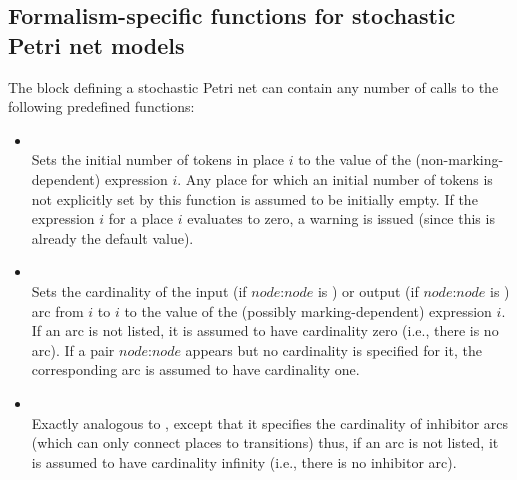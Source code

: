 \begin{private}

\section{Formalism-specific functions for stochastic Petri net models}
\label{SEC:spn-predefined-builder-functions}



The block defining a stochastic Petri net can contain any number
of calls to the following predefined functions:

\begin{itemize}

\item
{}\\
Sets the initial number of tokens in place $i$ to the value of the
(non-marking-dependent)  expression $i$.
Any place for which an initial number of tokens is not explicitly set
by this function is assumed to be initially empty.
If the expression $i$ for a place $i$ evaluates to zero,
a warning is issued (since this is already the default value).

\item
{}\\
Sets the cardinality of the input (if $node$:$node$ is )
or output (if  $node$:$node$ is ) arc
from $i$ to $i$ to the value of the
(possibly marking-dependent)  expression $i$.
If an arc is not listed, it is assumed to have cardinality zero
(i.e., there is no arc).
If a pair $node$:$node$ appears but no cardinality is specified for it, the
corresponding arc is assumed to have cardinality one.

\item
{}\\
Exactly analogous to , except that it specifies the cardinality of
inhibitor arcs (which can only connect places to transitions) thus,
if an arc is not listed, it is assumed to have cardinality infinity
(i.e., there is no inhibitor arc).


\end{itemize}
\end{private}
